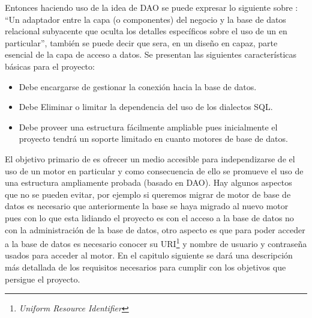 Entonces haciendo uso de la idea de DAO se puede expresar lo siguiente sobre \jj: ``Un adaptador entre la capa (o componentes) del negocio y la base de datos relacional subyacente que oculta los detalles específicos sobre el uso de un \dd en particular'', también se puede decir que \jj sera, en un diseño en capaz, parte esencial de la capa de acceso a datos. Se presentan las siguientes características básicas para el proyecto:
%
\begin{itemize}
\item Debe encargarse de gestionar la conexión hacia la base de datos.
\item Debe Eliminar o limitar la dependencia del uso de los dialectos SQL.
\item Debe proveer una estructura fácilmente ampliable pues inicialmente el proyecto tendrá un soporte limitado en cuanto motores de base de datos.
\end{itemize}
%
El objetivo primario de \jj es ofrecer un medio accesible para independizarse de el uso de un motor en particular y como consecuencia de ello se promueve el uso de una estructura ampliamente probada (basado en DAO). Hay algunos aspectos que no se pueden evitar, por ejemplo si queremos migrar de motor de base de datos es necesario que anteriormente la base se haya migrado al nuevo motor pues con lo que esta lidiando el proyecto es con el acceso a la base de datos no con la administración de la base de datos, otro aspecto es que para poder acceder a la base de datos es necesario conocer su URI\footnote{\textit{Uniform Resource Identifier}} y nombre de usuario y contraseña usados para acceder al motor. En el capitulo siguiente se dará una descripción más detallada de los requisitos necesarios para cumplir con los objetivos que persigue el proyecto. 